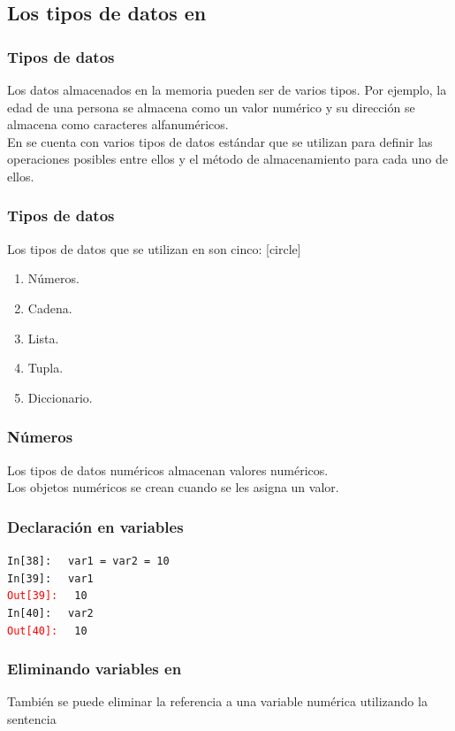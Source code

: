 \documentclass[12pt]{beamer}
\begin{document}
{\subsection{Los tipos de datos en \python}
\begin{frame}
\frametitle{Tipos de datos}
Los datos almacenados en la memoria pueden ser de varios tipos. Por ejemplo, la edad de una persona se almacena como un valor numérico y su dirección se almacena como caracteres alfanuméricos.
\\
\bigskip
En \python{} se cuenta con varios tipos de datos estándar que se utilizan para definir las operaciones posibles entre ellos y el método de almacenamiento para cada uno de ellos.
\end{frame}
\begin{frame}
\frametitle{Tipos de datos}
Los tipos de datos que se utilizan en \python{} son cinco:
[circle]
\begin{enumerate}[<+->]
\item Números.
\item Cadena.
\item Lista.
\item Tupla.
\item Diccionario.
\end{enumerate}
\end{frame}
\begin{frame}
\frametitle{Números}
Los tipos de datos numéricos almacenan valores numéricos.
\\
\bigskip
Los objetos numéricos se crean cuando se les asigna un valor.
\end{frame}
\begin{frame}[fragile]
\frametitle{Declaración en variables}
\textcolor{ao}{\texttt{In[38]: }} \verb| var1 = var2 = 10| \\
\pause
\textcolor{ao}{\texttt{In[39]: }} \verb| var1| \\
\pause
\textcolor{red}{\texttt{Out[39]: }} \verb| 10| \\
\pause
\textcolor{ao}{\texttt{In[40]: }} \verb| var2| \\
\pause
\textcolor{red}{\texttt{Out[40]: }} \verb| 10|
\end{frame}
\begin{frame}
\frametitle{Eliminando variables en \python}
También se puede eliminar la referencia a una variable numérica utilizando la sentencia 
\\
\bigskip

\end{frame}}
\end{document}
